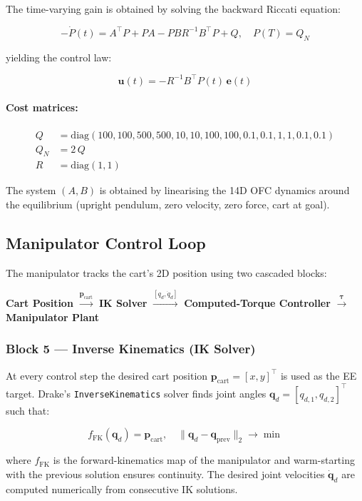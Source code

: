 \documentclass[11pt, a4paper]{article}
\begin{document}
The time-varying gain is obtained by solving the backward Riccati equation:

\[
-\dot{P}(t) = A^{\top}P + PA - PBR^{-1}B^{\top}P + Q,
\quad P(T) = Q_N
\]

yielding the control law:

\[
\bm{u}(t) = -R^{-1}B^{\top}P(t)\,\bm{e}(t)
\]

\paragraph{Cost matrices:}
\begin{align*}
Q &= \mathrm{diag}(100, 100, 500, 500, 10, 10, 100, 100, 0.1, 0.1, 1, 1, 0.1, 0.1) \\
Q_N &= 2\,Q \\
R &= \mathrm{diag}(1, 1)
\end{align*}

The system $(A, B)$ is obtained by linearising the 14D OFC dynamics around
the equilibrium (upright pendulum, zero velocity, zero force, cart at goal).

\subsection{Manipulator Control Loop}

The manipulator tracks the cart's 2D position using two cascaded blocks:

\begin{center}
\textbf{Cart Position} $\xrightarrow{\bm{p}_{\mathrm{cart}}}$
\textbf{IK Solver} $\xrightarrow{[q_d, \dot{q}_d]}$
\textbf{Computed-Torque Controller} $\xrightarrow{\bm{\tau}}$
\textbf{Manipulator Plant}
\end{center}

\subsubsection*{Block 5 — Inverse Kinematics (IK Solver)}

At every control step the desired cart position
$\bm{p}_{\mathrm{cart}} = [x, y]^{\top}$ is used as the EE target.
Drake's \texttt{InverseKinematics} solver finds joint angles
$\bm{q}_d = [q_{d,1}, q_{d,2}]^{\top}$ such that:

\[
\boxed{
f_{\mathrm{FK}}(\bm{q}_d) = \bm{p}_{\mathrm{cart}}, \quad
\|\bm{q}_d - \bm{q}_{\mathrm{prev}}\|_2 \to \min
}
\]

where $f_{\mathrm{FK}}$ is the forward-kinematics map of the manipulator and
warm-starting with the previous solution ensures continuity.
The desired joint velocities $\dot{\bm{q}}_d$ are computed numerically from
consecutive IK solutions.
\end{document}
